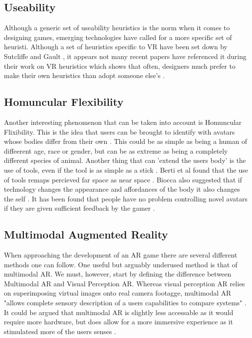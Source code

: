 \documentclass{scrartcl}
\begin{document}
\subsection{Useability}
Although a generic set of useability heuristics is the norm when it comes to designing games, emerging technologies have called for a more specific set of heuristi\cite{hvannberg2012exploitation}. Although a set of heuristics specific to VR have been set down by Sutcliffe and Gault \cite{sutcliffe2004heuristic}, it appears not many recent papers have referenced it during their work on VR heuristics which shows that often, designers much prefer to make their own heuristics than adopt someone else's \cite{hvannberg2012exploitation}.

\subsection{Homuncular Flexibility}
Another interesting phenomenon that can be taken into account is Homuncular Flixibility. This is the idea that users can be brought to identify with avatars whose bodies differ from their own \cite{won2015homuncular}.  This could be as simple as being a human of diffeerent age, race or gender, but can be as extreme as being a completely different species of animal. Another thing that can 'extend the users body' is the use of tools, even if the tool is as simple as a stick \cite{won2015homuncular}. Berti et al found that the use of tools remaps percieved far space as near space \cite{berti2000far}. Biocca also suggested that if technology changes the appearance and affordances of the body it also changes the self \cite{biocca1997cyborg}. It has been found that people have no problem controlling novel avatars if they are given sufficient feedback by the gamer \cite{won2015homuncular}.

\subsection{Multimodal Augmented Reality}
When approaching the development of an AR game there are several different methods one can follow. One useful but arguably underused method is that of multimodal AR. We must, however, start by defining the difference between Multimodal AR and Visual Perception AR. Whereas visual perception AR relies on superimposing virtual images onto real camera footagge, multimodal AR "allows complete sensory description of a users capabilities to compare systems" \cite{rosa2016re}. It could be argued that multimodal AR is slightly less accessable as it would require more hardware, but does allow for a more immersive experience as it stimulatesd more of the users senses \cite{rosa2016re}.
\end{document}

